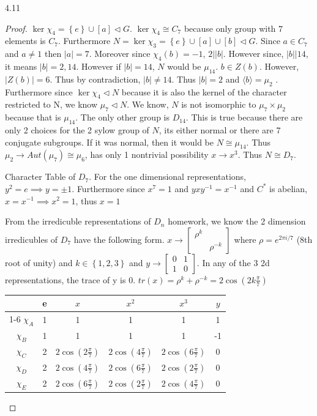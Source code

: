 \documentclass{article}
\newcommand{\angles}[1]{\langle #1 \rangle}
\begin{document}
\begin{PROB}{4.11}\label{Problem 4.11.}
\end{PROB}
\begin{proof}
    $\ker \chi_4 = \left\{ e \right\} \cup [a] \triangleleft G$. $\ker \chi_4 \cong C_7$ because only group with $7$ elements is $C_7$. Furthermore $N = \ker \chi_3 = \left\{ e \right\} \cup [a] \cup [b]\triangleleft G$. Since $a \in C_7$ and $a \neq 1$ then $|a| = 7$. Moreover since $\chi_4(b) = -1$, $2 | |b|$. However since, $|b| | 14$, it means $|b| = 2, 14$. However if $|b| = 14$, $N$ would be $\mu_{14}$. $b \in Z(b)$. However, $|Z(b)| = 6$. Thus by contradiction, $|b| \neq 14$.   Thus $|b| = 2$ and $\angles{b} = \mu_2$ . Furthermore since $\ker \chi_4 \triangleleft N$ because it is also the kernel of the character restricted to N, we know $\mu_7 \triangleleft N$. We know, $N$ is not isomorphic to $\mu_7 \times \mu_2$ because that is $\mu_{14}$. The only other group is $D_{14}$. This is true because there are only 2 choices for the 2 sylow group of $N$, its either normal or there are 7 conjugate subgroups. If it was normal, then it would be $N \cong \mu_{14}$. Thus $\mu_2 \to Aut(\mu_7) \cong \mu_6$, has only 1 nontrivial possibility $x \to x^3$. Thus $N \cong D_{7}$.
    
    Character Table of $D_7$. For the one dimensional representations, $y^2 = e \implies y = \pm 1$. Furthermore since $x^7 = 1$ and $yxy^{-1} = x^{-1}$ and $C^*$ is abelian, $x = x^{-1} \implies x^2 = 1$, thus $x = 1$  
    
    From the irredicuble representations of $D_n$ homework, we know the 2 dimension irredicubles of $D_7$ have the following form. $x \to \begin{bmatrix}
        \rho^k \\ & \rho^{-k}
    \end{bmatrix}$ where $\rho = e^{2 \pi i / 7}$ (8th root of unity) and $k \in \left\{1, 2, 3 \right\}$ and $y \to \begin{bmatrix}
        0 & 1 \\ 1 & 0
    \end{bmatrix}$. In any of the 3 2d representations, the trace of y is 0. $tr(x) = \rho^{k} + \rho^{-k} = 2\cos(2k\frac{\pi}{7})$
    
    \begin{tabular}{c | c c c c c }
        & e & $x$ & $x^2$ & $x^3$ & $y$  \\
        \cline{1-6}
        $\chi_A$ & 1 & 1 & 1 & 1 & 1 \\
        $\chi_B$ & 1 & 1 & 1 & 1 & -1 \\
        $\chi_C$ & 2 & $2\cos(2\frac{\pi}{7})$ & $2\cos(4\frac{\pi}{7})$ & $2\cos(6\frac{\pi}{7})$ & 0 \\
        $\chi_D$ & 2 & $2\cos(4\frac{\pi}{7})$ & $2\cos(6\frac{\pi}{7})$ & $2\cos(2\frac{\pi}{7})$ & 0 \\
        $\chi_E$ & 2 & $2\cos(6\frac{\pi}{7})$ & $2\cos(2\frac{\pi}{7})$ & $2\cos(4\frac{\pi}{7})$ & 0 \\


\end{tabular}
\end{proof}
\end{document}

